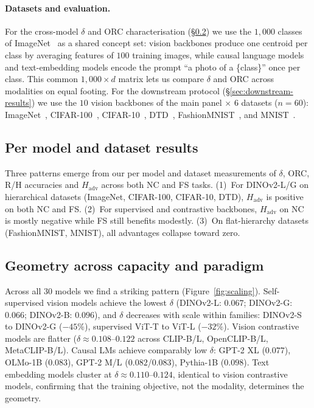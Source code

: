 \documentclass{article}
\begin{document}
\paragraph{Datasets and evaluation.} For the cross-model $\delta$ and ORC characterisation (\S\ref{sec:geometry-paradigm}) we use the $1{,}000$ classes of ImageNet~\citep{imagenet} as a shared concept set: vision backbones produce one centroid per class by averaging features of $100$ training images, while causal language models and text-embedding models encode the prompt ``a photo of a \{class\}'' once per class. This common $1{,}000 \times d$ matrix lets us compare $\delta$ and ORC across modalities on equal footing. For the downstream protocol (\S\ref{sec:downstream-results}) we use the $10$ vision backbones of the main panel $\times$ $6$ datasets ($n = 60$): ImageNet~\citep{imagenet}, CIFAR-100~\citep{cifar10}, CIFAR-10~\citep{cifar10}, DTD~\citep{dtd}, FashionMNIST~\citep{fashion}, and MNIST~\citep{mnist}.


\subsection{Per model and dataset results}
\label{sec:complete-results}

Three patterns emerge from our per model and dataset measurements of $\delta$, ORC, R/H accuracies and $H_{\mathrm{adv}}$ across both NC and FS tasks. (1)~For DINOv2-L/G on hierarchical datasets (ImageNet, CIFAR-100, CIFAR-10, DTD), $H_{\mathrm{adv}}$ is positive on both NC and FS. (2)~For supervised and contrastive backbones, $H_{\mathrm{adv}}$ on NC is mostly negative while FS still benefits modestly. (3)~On flat-hierarchy datasets (FashionMNIST, MNIST), all advantages collapse toward zero.

\subsection{Geometry across capacity and paradigm}
\label{sec:geometry-paradigm}

Across all 30 models we find a striking pattern (Figure~\ref{fig:scaling}). Self-supervised vision models achieve the lowest $\delta$ (DINOv2-L: $0.067$; DINOv2-G: $0.066$; DINOv2-B: $0.096$), and $\delta$ decreases with scale within families: DINOv2-S to DINOv2-G ($-45\%$), supervised ViT-T to ViT-L ($-32\%$). Vision contrastive models are flatter ($\delta \approx 0.108$--$0.122$ across CLIP-B/L, OpenCLIP-B/L, MetaCLIP-B/L). Causal LMs achieve comparably low $\delta$: GPT-2 XL ($0.077$), OLMo-1B ($0.083$), GPT-2 M/L ($0.082$/$0.083$), Pythia-1B ($0.098$). Text embedding models cluster at $\delta \approx 0.110$--$0.124$, identical to vision contrastive models, confirming that the training objective, not the modality, determines the geometry.
\end{document}

